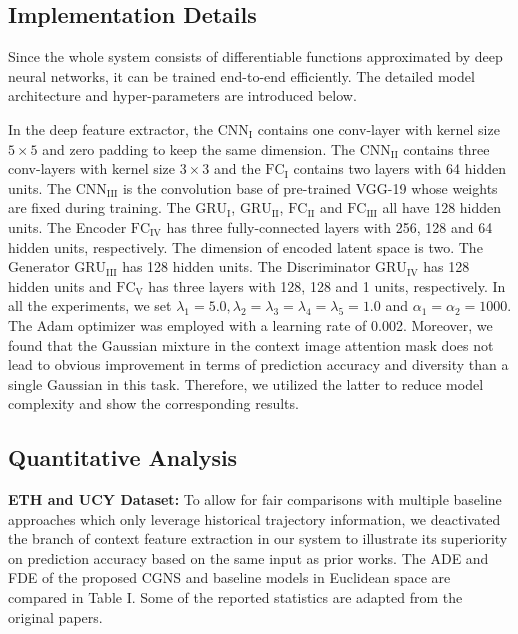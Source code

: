 \documentclass[letterpaper, 10 pt, conference]{ieeeconf}
\begin{document}
\subsection{Implementation Details}
Since the whole system consists of differentiable functions approximated by deep neural networks, it can be trained end-to-end efficiently. The detailed model architecture and hyper-parameters are introduced below.

In the deep feature extractor, the $\text{CNN}_\text{I}$ contains one conv-layer with kernel size $5\times5$ and zero padding to keep the same dimension. The $\text{CNN}_\text{II}$ contains three conv-layers with kernel size $3\times3$ and the $\text{FC}_\text{I}$ contains two layers with 64 hidden units. The $\text{CNN}_\text{III}$ is the convolution base of pre-trained VGG-19 whose weights are fixed during training. The $\text{GRU}_\text{I}$, $\text{GRU}_\text{II}$, $\text{FC}_\text{II}$ and $\text{FC}_\text{III}$ all have 128 hidden units.
The Encoder $\text{FC}_\text{IV}$ has three fully-connected layers with 256, 128 and 64 hidden units, respectively. The dimension of encoded latent space is two.
The Generator $\text{GRU}_\text{III}$ has 128 hidden units. The Discriminator $\text{GRU}_\text{IV}$ has 128 hidden units and $\text{FC}_\text{V}$ has three layers with 128, 128 and 1 units, respectively.
In all the experiments, we set $\lambda_1=5.0, \lambda_{2}=\lambda_3=\lambda_4=\lambda_5=1.0$ and $\alpha_1=\alpha_2=1000$.
The Adam optimizer was employed with a learning rate of 0.002. 
Moreover, we found that the Gaussian mixture in the context image attention mask does not lead to obvious improvement in terms of prediction accuracy and diversity than a single Gaussian in this task. Therefore, we utilized the latter to reduce model complexity and show the corresponding results.


\subsection{Quantitative Analysis}
\textbf{ETH and UCY Dataset:} 
To allow for fair comparisons with multiple baseline approaches which only leverage historical trajectory information, we deactivated the branch of context feature extraction in our system to illustrate its superiority on prediction accuracy based on the same input as prior works.
The ADE and FDE of the proposed CGNS and baseline models in Euclidean space are compared in Table I. Some of the reported statistics are adapted from the original papers.
\end{document}
